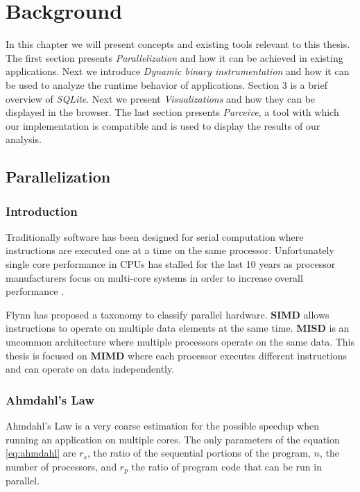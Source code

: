 \chapter{Background}

In this chapter we will present concepts and existing tools relevant to this thesis. The first section presents \textit{Parallelization} and how it can be achieved in existing applications. Next we introduce \textit{Dynamic binary instrumentation} and how it can be used to analyze the runtime behavior of applications. Section 3 is a brief overview of \textit{SQLite}. Next we present \textit{Visualizations} and how they can be displayed in the browser. The last section presents \textit{Parceive}, a tool with which our implementation is compatible and is used to display the results of our analysis.

\section {Parallelization}

\subsection{Introduction}

Traditionally software has been designed for serial computation where instructions are executed one at a time on the same processor. Unfortunately single core performance in CPUs has stalled for the last 10 years as processor manufacturers focus on multi-core systems in order to increase overall performance \cite{procspeed2}.

Flynn has proposed a taxonomy \cite{flynn} to classify parallel hardware. \textbf{SIMD} allows instructions to operate on multiple data elements at the same time. \textbf{MISD} is an uncommon architecture where multiple processors operate on the same data. This thesis is focused on \textbf{MIMD} where each processor executes different instructions and can operate on data independently.

\subsection{Ahmdahl's Law}

Ahmdahl's Law \cite{amdahl} is a very coarse estimation for the possible speedup when running an application on multiple cores. The only parameters of the equation \ref{eq:ahmdahl} are $r_s$, the ratio of the sequential portions of the program, $n$, the number of processors, and $r_p$ the ratio of program code that can be run in parallel.

